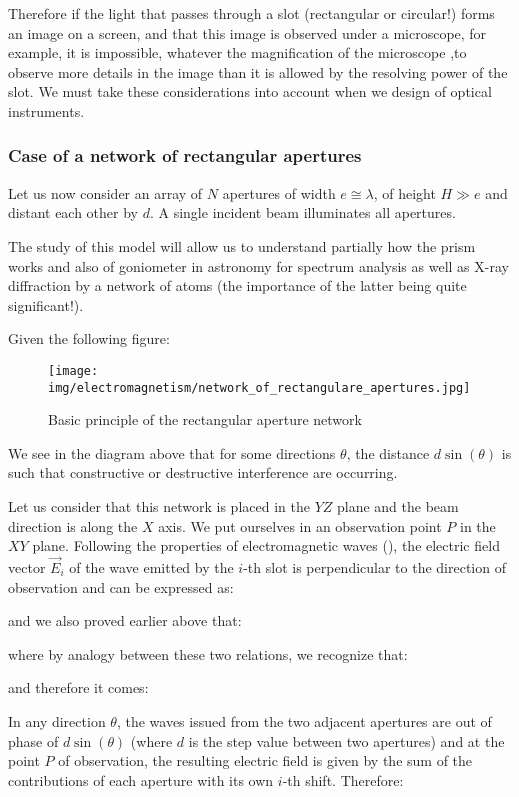 	Therefore if the light that passes through a slot (rectangular or circular!) forms an image on a screen, and that this image is observed under a microscope, for example, it is impossible, whatever the magnification of the microscope ,to observe more details in the image than it is allowed by the resolving power of the slot. We must take these considerations into account when we design of optical instruments.
	
	\subsubsection{Case of a network of rectangular apertures}
	Let us now consider an array of $N$ apertures of width $e\cong \lambda$, of height $H \gg e$ and distant each other by $d$. A single incident beam illuminates all apertures.
	\begin{tcolorbox}[title=Remark,colframe=black,arc=10pt]
	The study of this model will allow us to understand partially how the prism works and also of goniometer in astronomy for spectrum analysis as well as X-ray diffraction by a network of atoms (the importance of the latter being quite significant!).
	\end{tcolorbox}
	Given the following figure:
	\begin{figure}[H]
		\centering
		\texttt{[image: img/electromagnetism/network\_of\_rectangulare\_apertures.jpg]}
		\caption{Basic principle of the rectangular aperture network}
	\end{figure}
	We see in the diagram above that for some directions $\theta$, the distance $d\sin(\theta)$ is such that constructive or destructive interference are occurring.
	
	Let us consider that this network is placed in the $YZ$ plane and the beam direction is along the $X$ axis. We put ourselves in an observation point $P$ in the $XY$ plane. Following the properties of electromagnetic waves (), the electric field vector $\vec{E}_i$ of the wave emitted by the $i$-th slot is perpendicular to the direction of observation and can be expressed as:
	
	and we also proved earlier above that:
	
	where by analogy between these two relations, we recognize that:
	
	and therefore it comes:
	
	In any direction $\theta$, the waves issued from the two adjacent apertures are out of phase of $d\sin(\theta)$ (where $d$ is the step value between two apertures) and at the point $P$ of observation, the resulting electric field is given by the sum of the contributions of each aperture with its own $i$-th shift. Therefore:
	
